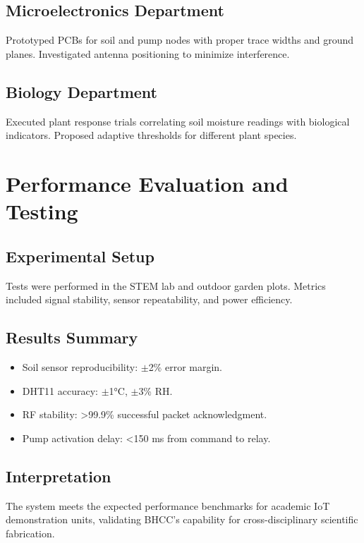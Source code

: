 \documentclass[12pt,a4paper]{article}
\begin{document}
\subsection{Microelectronics Department}
Prototyped PCBs for soil and pump nodes with proper trace widths and ground planes. Investigated antenna positioning to minimize interference.

\subsection{Biology Department}
Executed plant response trials correlating soil moisture readings with biological indicators. Proposed adaptive thresholds for different plant species.

\clearpage
\section{Performance Evaluation and Testing}

\subsection{Experimental Setup}
Tests were performed in the STEM lab and outdoor garden plots. Metrics included signal stability, sensor repeatability, and power efficiency.

\subsection{Results Summary}
\begin{itemize}
  \item Soil sensor reproducibility: $\pm$2\% error margin.
  \item DHT11 accuracy: $\pm$1°C, $\pm$3\% RH.
  \item RF stability: >99.9\% successful packet acknowledgment.
  \item Pump activation delay: <150 ms from command to relay.
\end{itemize}

\subsection{Interpretation}
The system meets the expected performance benchmarks for academic IoT demonstration units, validating BHCC’s capability for cross-disciplinary scientific fabrication.

\clearpage
\end{document}

